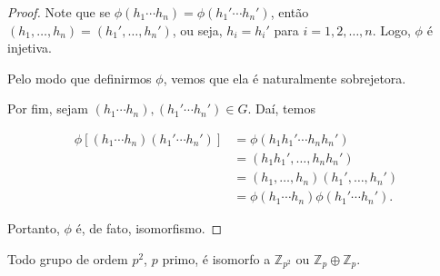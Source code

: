 \begin{proof}
		\par\vspace{0.3cm} Note que se $\phi(h_1\cdots h_n) = \phi(h_1'\cdots h_n')$, então $(h_1, \dots, h_n) = (h_1', \dots, h_n')$, ou seja, $h_i = h_i'$ para $i = 1, 2, \dots, n$. Logo, $\phi$ é injetiva.
		
		\par\vspace{0.3cm} Pelo modo que definirmos $\phi$, vemos que ela é naturalmente sobrejetora.
		
		\par\vspace{0.3cm} Por fim, sejam $(h_1\cdots h_n), (h_1'\cdots h_n')\in G$. Daí, temos
		
		\begin{align*}
		\phi[ (h_1\cdots h_n)(h_1'\cdots h_n') ] &= \phi (h_1h_1'\cdots h_nh_n') \\ &= (h_1h_1', \dots, h_nh_n') \\ &= (h_1, \dots, h_n)(h_1', \dots, h_n') \\ &= \phi(h_1\cdots h_n)\phi(h_1'\cdots h_n').
		\end{align*} 
		
		\par\vspace{0.3cm} Portanto, $\phi$ é, de fato, isomorfismo.
		
	\end{proof}
	
	
	\begin{theorem}
		\label{classificacao grupos de ordem p2}
		Todo grupo de ordem $p^2$, $p$ primo, é isomorfo a $\mathbb{Z}_{p^2}$ ou $\mathbb{Z}_p\oplus\mathbb{Z}_p$.
	\end{theorem}
	
